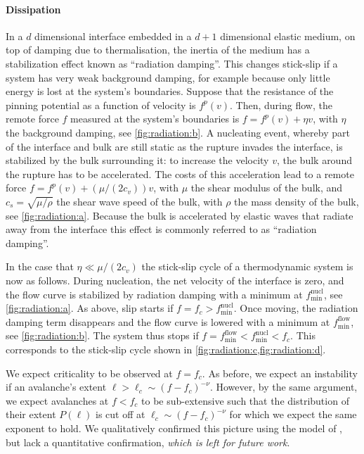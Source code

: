 \documentclass{goose-article}
\begin{document}
\paragraph{Dissipation}

In a $d$ dimensional interface embedded in a $d + 1$ dimensional elastic medium, on top of damping due to thermalisation, the inertia of the medium has a stabilization effect known as ``radiation damping''.
This changes stick-slip if a system has very weak background damping, for example because only little energy is lost at the system's boundaries.
Suppose that the resistance of the pinning potential as a function of velocity is $f^p(v)$.
Then, during flow, the remote force $f$ measured at the system's boundaries is $f = f^p(v) + \eta v$, with $\eta$ the background damping, see \cref{fig:radiation:b}.
A nucleating event, whereby part of the interface and bulk are still static as the rupture invades the interface, is stabilized by the bulk surrounding it: to increase the velocity $v$, the bulk around the rupture has to be accelerated.
The costs of this acceleration lead to a remote force $f = f^p(v) + (\mu / (2 c_v)) v$, with $\mu$ the shear modulus of the bulk, and $c_s = \sqrt{\mu / \rho}$ the shear wave speed of the bulk, with $\rho$ the mass density of the bulk, see \cref{fig:radiation:a}.
Because the bulk is accelerated by elastic waves that radiate away from the interface this effect is commonly referred to as ``radiation damping''.

In the case that $\eta \ll \mu / (2 c_v)$ the stick-slip cycle of a thermodynamic system is now as follows.
During nucleation, the net velocity of the interface is zero, and the flow curve is stabilized by radiation damping with a minimum at $f_{\min}^\text{nucl}$, see \cref{fig:radiation:a}.
As above, slip starts if $f = f_c > f_{\min}^\text{nucl}$.
Once moving, the radiation damping term disappears and the flow curve is lowered with a minimum at $f_{\min}^\text{flow}$, see \cref{fig:radiation:b}.
The system thus stops if $f = f_{\min}^\text{flow} < f_{\min}^\text{nucl} < f_c$.
This corresponds to the stick-slip cycle shown in \cref{fig:radiation:c,fig:radiation:d}.

We expect criticality to be observed at $f = f_c$.
As before, we expect an instability if an avalanche's extent $\ell > \ell_c \sim (f - f_c)^{-\nu}$.
However, by the same argument, we expect avalanches at $f < f_c$ to be sub-extensive such that the distribution of their extent $P(\ell)$ is cut off at $\ell_c \sim (f - f_c)^{-\nu}$ for which we expect the same exponent to hold.
We qualitatively confirmed this picture using the model of \cite{deGeus2019,deGeus2022}, but lack a quantitative confirmation, \emph{which is left for future work}.
\end{document}
